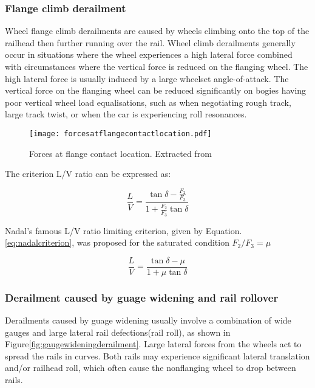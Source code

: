 \subsubsection{Flange climb derailment}
Wheel flange climb derailments are caused by wheels climbing onto the top of the railhead then further running over the rail. Wheel climb derailments generally occur in situations where the wheel experiences a high lateral force combined with circumstances where the vertical force is reduced on the flanging wheel. The high lateral force is usually induced by a large wheelset angle-of-attack. The vertical force on the flanging wheel can be reduced significantly on bogies having poor vertical wheel load equalisations, such as when negotiating rough track, large track twist, or when the car is experiencing roll resonances. 

\begin{figure}[h]
    \centering
    \texttt{[image: forcesatflangecontactlocation.pdf]}
    \caption{Forces at flange contact location. Extracted from \cite[Figure8.4]{iwnicki2006handbook}}
    \label{fig:forcesatflangecontactlocation}
\end{figure}

The criterion L/V ratio can be expressed as:

\begin{equation}
    \frac{L}{V}=\frac{\tan \delta -\frac{F_2}{F_3}}{1+\frac{F_2}{F_3}\tan \delta}
\end{equation}

Nadal's famous L/V ratio limiting criterion, given by Equation.\ref{eq:nadalcriterion}, was proposed for the saturated condition $F_2/F_3=\mu$

\begin{equation}\label{eq:nadalcriterion}
    \frac{L}{V}=\frac{\tan \delta - \mu}{1+ \mu \tan \delta}
\end{equation}

\subsubsection{Derailment caused by guage widening and rail rollover}
Derailments caused by guage widening usually involve a combination of wide gauges and large lateral rail defections(rail roll), as shown in Figure\ref{fig:gaugewideningderailment}. Large lateral forces from the wheels act to spread the rails in curves. Both rails may experience significant lateral translation and/or railhead roll, which often cause the nonflanging wheel to drop between rails.

